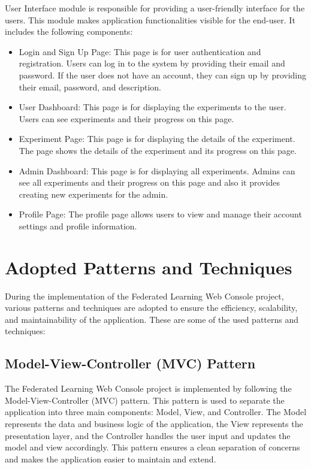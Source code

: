 User Interface module is responsible for providing a user-friendly interface for the users. This module makes application functionalities visible for the end-user. It includes the following components:\\
\begin{itemize}
    \item Login and Sign Up Page: This page is for user authentication and registration. Users can log in to the system by providing their email and password. If the user does not have an account, they can sign up by providing their email, password, and description.
    \item User Dashboard: This page is for displaying the experiments to the user. Users can see experiments and their progress on this page.
    \item Experiment Page: This page is for displaying the details of the experiment. The page shows the details of the experiment and its progress on this page.
    \item Admin Dashboard: This page is for displaying all experiments. Admins can see all experiments and their progress on this page and also it provides creating new experiments for the admin.
    \item Profile Page: The profile page allows users to view and manage their account settings and profile information.
\end{itemize}

\section{Adopted Patterns and Techniques}


During the implementation of the Federated Learning Web Console project, various patterns and techniques are adopted to ensure the efficiency, scalability, and maintainability of the application. These are some of the used patterns and techniques:\\

\subsection*{Model-View-Controller (MVC) Pattern}
The Federated Learning Web Console project is implemented by following the Model-View-Controller (MVC) pattern. This pattern is used to separate the application into three main components: Model, View, and Controller. The Model represents the data and business logic
of the application, the View represents the presentation layer, and the Controller handles the user input and updates the model and view accordingly. This pattern ensures a clean separation of concerns and makes the application easier to maintain and extend.\\

